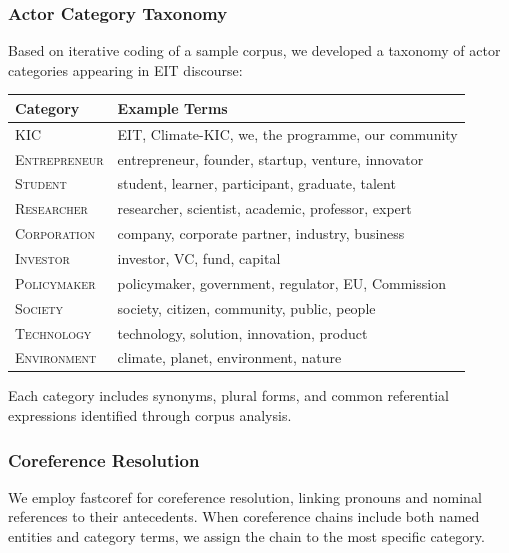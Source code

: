 \documentclass[../main.tex]{subfiles}
\begin{document}
\subsubsection{Actor Category Taxonomy}

Based on iterative coding of a sample corpus, we developed a taxonomy of actor categories appearing in EIT discourse:

\begin{center}
\small
\begin{tabular}{lp{7cm}}
\toprule
\textbf{Category} & \textbf{Example Terms} \\
\midrule
\textsc{KIC} & EIT, Climate-KIC, we, the programme, our community \\
\textsc{Entrepreneur} & entrepreneur, founder, startup, venture, innovator \\
\textsc{Student} & student, learner, participant, graduate, talent \\
\textsc{Researcher} & researcher, scientist, academic, professor, expert \\
\textsc{Corporation} & company, corporate partner, industry, business \\
\textsc{Investor} & investor, VC, fund, capital \\
\textsc{Policymaker} & policymaker, government, regulator, EU, Commission \\
\textsc{Society} & society, citizen, community, public, people \\
\textsc{Technology} & technology, solution, innovation, product \\
\textsc{Environment} & climate, planet, environment, nature \\
\bottomrule
\end{tabular}
\end{center}

Each category includes synonyms, plural forms, and common referential expressions identified through corpus analysis.

\subsubsection{Coreference Resolution}

We employ fastcoref \parencite{otmazgin2023lingmess} for coreference resolution, linking pronouns and nominal references to their antecedents. When coreference chains include both named entities and category terms, we assign the chain to the most specific category.
\end{document}
